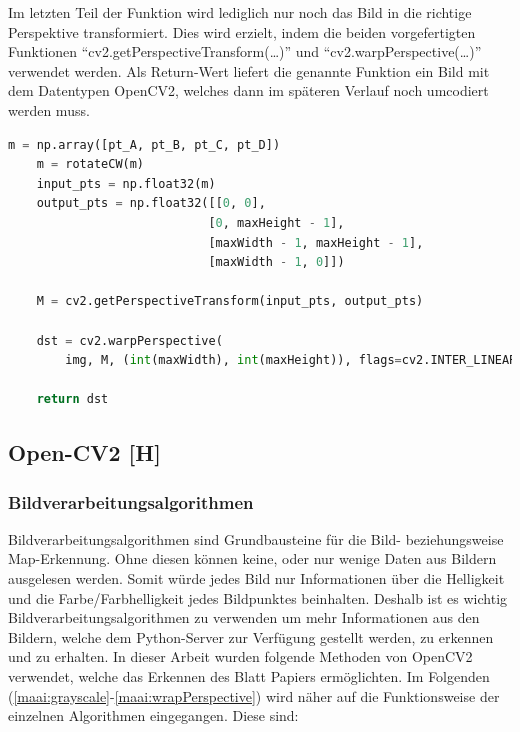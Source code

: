 Im letzten Teil der Funktion wird lediglich nur noch das Bild in die richtige Perspektive transformiert. Dies wird erzielt, indem die beiden vorgefertigten Funktionen ``cv2.getPerspectiveTransform(\dots)'' und ``cv2.warpPerspective(\dots)'' verwendet werden. Als Return-Wert liefert die genannte Funktion ein Bild mit dem Datentypen OpenCV2, welches dann im späteren Verlauf noch umcodiert werden muss.

\begin{lstlisting}[language=Python,label=lst:impl:wrapPerspective,firstnumber=40]
    m = np.array([pt_A, pt_B, pt_C, pt_D])
    m = rotateCW(m)
    input_pts = np.float32(m)
    output_pts = np.float32([[0, 0],
                            [0, maxHeight - 1],
                            [maxWidth - 1, maxHeight - 1],
                            [maxWidth - 1, 0]])

    M = cv2.getPerspectiveTransform(input_pts, output_pts)

    dst = cv2.warpPerspective(
        img, M, (int(maxWidth), int(maxHeight)), flags=cv2.INTER_LINEAR)

    return dst
\end{lstlisting}


\subsection{Open-CV2 [H]}
\subsubsection{Bildverarbeitungsalgorithmen} \label{maai:alogs}

Bildverarbeitungsalgorithmen sind Grundbausteine für die Bild- beziehungsweise Map-Erkennung. Ohne diesen können keine, oder nur wenige Daten aus Bildern ausgelesen werden. Somit würde jedes Bild nur Informationen über die Helligkeit und die Farbe/Farbhelligkeit jedes Bildpunktes beinhalten. Deshalb ist es wichtig Bildverarbeitungsalgorithmen zu verwenden um mehr Informationen aus den Bildern, welche dem Python-Server zur Verfügung gestellt werden, zu erkennen und zu erhalten. In dieser Arbeit wurden folgende Methoden von OpenCV2 verwendet, welche das Erkennen des Blatt Papiers ermöglichten. Im Folgenden (\ref{maai:grayscale}-\ref{maai:wrapPerspective}) wird näher auf die Funktionsweise der einzelnen Algorithmen eingegangen. Diese sind:

